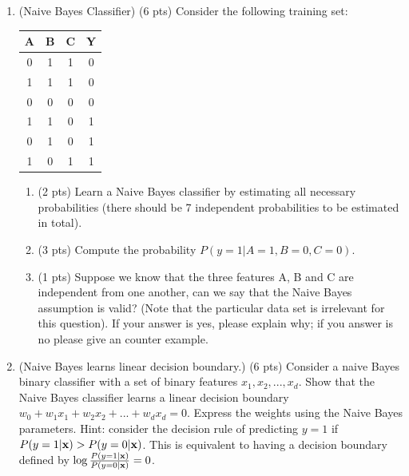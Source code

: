 \documentclass{article}
\def\x{{\bf x}}
\begin{document}
\begin{enumerate}
\begin{itemize}
\end{itemize}
\item (Naive Bayes Classifier) (6 pts) Consider the following training set:
\begin{center}
\begin{tabular}{|c|c|c|c|}\hline
A&B&C&Y\\ \hline
0&1&1&0 \\ \hline
1&1&1&0 \\ \hline
0&0&0&0 \\ \hline
1&1&0&1 \\ \hline
0&1&0&1 \\ \hline
1&0&1&1 \\ \hline
\end{tabular}
\end{center}
\begin{enumerate}
\item (2 pts) Learn a Naive Bayes classifier by estimating
all necessary probabilities (there should be 7 independent probabilities to be 
estimated in total).

\item (3 pts) Compute the probability $P(y=1|A=1, B=0, C=0)$.
\item (1 pts) Suppose we know that the three features A, B and C are independent 
from one another, can we say that the Naive Bayes assumption is valid? (Note 
that the particular data set is irrelevant for this question). If your answer 
is yes, please explain why; if you answer is no please give an counter example.


\end{enumerate}

\item (Naive Bayes learns linear decision boundary.) (6 pts) Consider a naive 
Bayes binary classifier with a set of binary features $x_1, x_2, ...,x_d$. Show 
that the Naive Bayes classifier learns a linear decision boundary 
$w_0+w_1x_1+w_2x_2+...+w_dx_d=0$. Express the weights using the Naive Bayes 
parameters. Hint: consider the decision rule of predicting 
$y=1$ if $P(y=1|\x) > P(y=0|\x)$. This is equivalent to having a decision 
boundary defined by $\log\frac{P(y=1|\x)}{P(y=0|\x)}=0$.

\end{enumerate}
\end{document}

